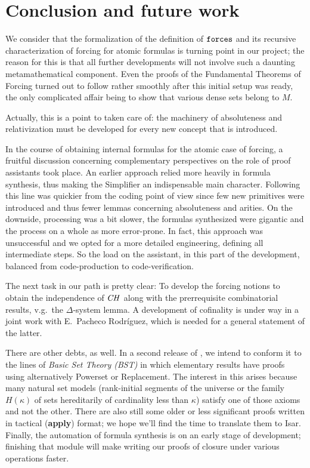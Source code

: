 \section{Conclusion and future work}
\label{sec:conclusion}

We consider that the formalization of the definition of $\mathop{\mathtt{forces}}$
and its recursive characterization of forcing for atomic formulas is
turning point
in our project; the reason for this is that all further
developments will not involve such a daunting metamathematical
component. Even the proofs of the Fundamental Theorems of Forcing
turned out to follow rather smoothly after this initial setup was
ready, the only complicated affair being to show that various dense sets belong
to $M$. 
\begin{framed}
  Actually, this is a point to taken care of: the machinery of
  absoluteness and relativization must be developed for every new
  concept that is introduced.
\end{framed}

In the course of obtaining internal formulas for the atomic case of
forcing, a fruitful discussion
concerning complementary perspectives on the role of proof assistants
took place. An earlier approach relied more heavily in formula
synthesis, thus making the Simplifier an indispensable main
character. Following this line was quickier from the coding point of
view since few new primitives were introduced and thus fewer lemmas
concerning absoluteness and arities. On the downside, processing was a
bit slower, the formulas synthesized were gigantic and the process on
a whole as more error-prone. In fact, this approach was unsuccessful
and we opted for a more detailed engineering, defining all
intermediate steps. So the load on the assistant, in this part of the
development, balanced from code-production to code-verification. 

The next task in our path is pretty clear: To develop the forcing
notions to obtain the independence of $\mathit{CH}$ 
along with the prerrequisite combinatorial results, v.g.\ the
$\Delta$-system lemma. A development of cofinality is under way in a
joint work with E.~Pacheco Rodríguez, which is needed for a general
statement of the latter. 

There are other debts, as well. In a second
release of , we intend to conform it to the
lines of \emph{Basic Set Theory (BST)} \cite[I.3.1]{kunen2011set} in
which elementary results have proofs using alternatively Powerset or
Replacement. The interest in this arises because many natural set
models
(rank-initial segments of the universe or the family $H(\kappa)$ of
sets hereditarily of cardinality less than $\kappa$) satisfy one of
those axioms and not the other. There are also still some older or
less significant proofs written in tactical (\textbf{apply}) format; we
hope we'll find the time to translate them to Isar. Finally, the
automation of formula synthesis is on an early stage of
development;  finishing that module will make writing our proofs of closure
under various operations faster.

